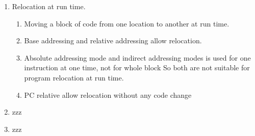 \begin{enumerate}
    \item Relocation at run time.
    \begin{enumerate}
      \item Moving a block of code from one location to another at run time.
      \item Base addressing and relative addressing allow relocation.
      \item Absolute addressing mode and indirect addressing modes is used for one instruction at one
            time, not for whole block So both are not suitable for program relocation at run time.
      \item PC relative allow relocation without any code change
    \end{enumerate}
    \item zzz
    \item zzz
\end{enumerate}
